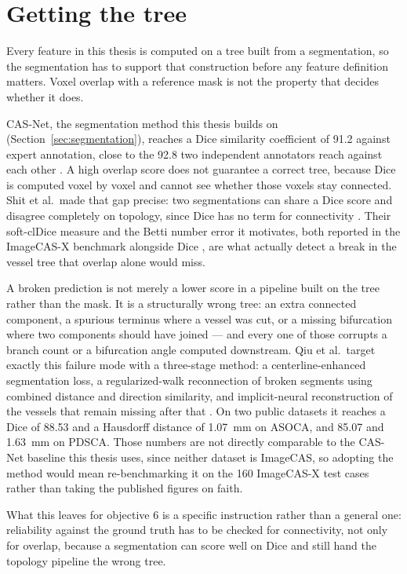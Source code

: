 %

\section{Getting the tree}
\label{sec:getting-tree}

Every feature in this thesis is computed on a tree built from a segmentation, so the segmentation
has to support that construction before any feature definition matters.
Voxel overlap with a reference mask is not the property that decides whether it does.

CAS-Net, the segmentation method this thesis builds on (Section~\ref{sec:segmentation}),
reaches a Dice similarity coefficient of 91.2 against expert annotation, close to the 92.8 two
independent annotators reach against each other \cite{bransby2026imagecasx}.
A high overlap score does not guarantee a correct tree, because Dice is computed voxel by voxel and
cannot see whether those voxels stay connected.
Shit et al.\ made that gap precise: two segmentations can share a Dice score and disagree completely
on topology, since Dice has no term for connectivity \cite{shit2021cldice}.
Their soft-clDice measure and the Betti number error it motivates, both reported in the ImageCAS-X
benchmark alongside Dice \cite{bransby2026imagecasx}, are what actually detect a break in the vessel
tree that overlap alone would miss.

A broken prediction is not merely a lower score in a pipeline built on the tree rather than the mask.
It is a structurally wrong tree: an extra connected component, a spurious terminus where a vessel was
cut, or a missing bifurcation where two components should have joined --- and every one of those
corrupts a branch count or a bifurcation angle computed downstream.
Qiu et al.\ target exactly this failure mode with a three-stage method: a centerline-enhanced
segmentation loss, a regularized-walk reconnection of broken segments using combined distance and
direction similarity, and implicit-neural reconstruction of the vessels that remain missing after
that \cite{qiu2025topology}.
On two public datasets it reaches a Dice of 88.53 and a Hausdorff distance of 1.07~mm on ASOCA, and
85.07 and 1.63~mm on PDSCA.
Those numbers are not directly comparable to the CAS-Net baseline this thesis uses, since neither
dataset is ImageCAS, so adopting the method would mean re-benchmarking it on the 160 ImageCAS-X test
cases rather than taking the published figures on faith.

What this leaves for objective 6 is a specific instruction rather than a general one: reliability
against the ground truth has to be checked for connectivity, not only for overlap, because a
segmentation can score well on Dice and still hand the topology pipeline the wrong tree.

